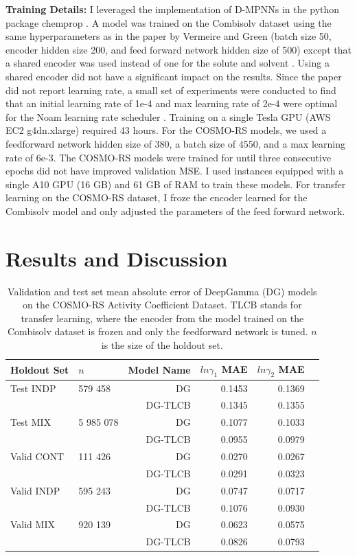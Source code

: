 \noindent
\textbf{Training Details:} I leveraged the implementation of D-MPNNs in the python package chemprop \cite{Yang2019, Heid2023a}. A model was trained on the Combisolv dataset using the same hyperparameters as in the paper by Vermeire and Green (batch size 50, encoder hidden size 200, and feed forward network hidden size of 500) except that a shared encoder was used instead of one for the solute and solvent \cite{Vermeire2021}. Using a shared encoder did not have a significant impact on the results. Since the paper did not report learning rate, a small set of experiments were conducted to find that an initial learning rate of 1e-4 and max learning rate of 2e-4 were optimal for the Noam learning rate scheduler \cite{Vaswani2017}. Training on a single Tesla GPU (AWS EC2 g4dn.xlarge) required 43 hours. For the COSMO-RS models, we used a feedforward network hidden size of 380, a batch size of 4550, and a max learning rate of 6e-3.  The COSMO-RS models were trained for until three consecutive epochs did not have improved validation MSE. I used instances equipped with a single A10 GPU (16 GB) and 61 GB of RAM to train these models. For transfer learning on the COSMO-RS dataset, I froze the encoder learned for the Combisolv model and only adjusted the parameters of the feed forward network.


\section{Results and Discussion}

\begin{table}
    \centering
    \caption{Validation and test set mean absolute error of DeepGamma (DG) models on the COSMO-RS Activity  Coefficient Dataset. TLCB stands for transfer learning, where the encoder from the model trained on the Combisolv dataset is frozen and only the feedforward network is tuned. $n$ is the size of the holdout set.}
    \label{tab:cosmo_rs_results}
    \begin{tabular}{llrrrr}
    \toprule
    Holdout Set & $n$ & Model Name &  $ln\gamma_1$ MAE &   $ln\gamma_2$ MAE \\
    \midrule
    Test INDP & 579 458 &  DG & 0.1453 & 0.1369 \\
              & &  DG-TLCB & 0.1345 & 0.1355 \\
    Test MIX & 5 985 078 & DG & 0.1077 & 0.1033 \\
              & & DG-TLCB & 0.0955 & 0.0979 \\
    Valid CONT & 111 426 &  DG & 0.0270 & 0.0267 \\
              & &  DG-TLCB & 0.0291 & 0.0323 \\
    Valid INDP & 595 243 &  DG & 0.0747 & 0.0717 \\
              & &  DG-TLCB & 0.1076 & 0.0930 \\
    Valid MIX & 920 139 & DG & 0.0623 & 0.0575 \\
              & &  DG-TLCB & 0.0826 & 0.0793 \\
    \bottomrule
    \end{tabular}
\end{table}


